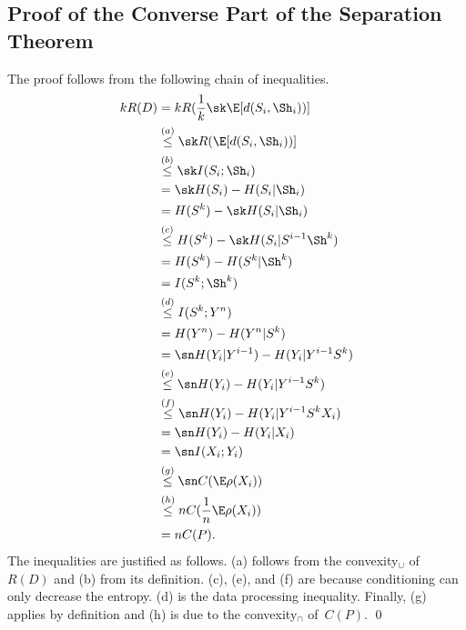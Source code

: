 \begin{subappendices}

\section{Proof of the Converse Part of the Separation Theorem}
\label{app:separationproof}

The proof follows from the following chain of inequalities.
{\allowdisplaybreaks
\begin{align*}
  kR(D) &= k R(\frac1k \sk \E[d(S_i, \Sh_i))] \\
  &\stackrel{(a)}{\le} \sk R(\E[d(S_i, \Sh_i))] \\
  &\stackrel{(b)}{\le} \sk I(S_i; \Sh_i) \\
  &= \sk H(S_i) - H(S_i|\Sh_i) \\
  &= H(S^k) - \sk H(S_i|\Sh_i) \\
  &\stackrel{(c)}{\le} H(S^k) - \sk H(S_i|S^{i-1} \Sh^k) \\
  &=H(S^k) - H(S^k|\Sh^k) \\
  &=I(S^k;\Sh^k) \\
  &\stackrel{(d)}{\le} I(S^k; Y^n) \\
  &= H(Y^n) - H(Y^n|S^k) \\
  &= \sn H(Y_i|Y^{i-1}) - H(Y_i|Y^{i-1} S^k)  \\
  &\stackrel{(e)}{\le} \sn H(Y_i) - H(Y_i|Y^{i-1} S^k) \\
  &\stackrel{(f)}{\le} \sn H(Y_i) - H(Y_i|Y^{i-1} S^k X_i) \\
  &= \sn H(Y_i) - H(Y_i|X_i) \\
  &= \sn I(X_i; Y_i) \\
  &\stackrel{(g)}{\le} \sn C(\E \rho(X_i)) \\
  &\stackrel{(h)}{\le} n C(\frac1n \E \rho(X_i)) \\
  &= n C(P).
\end{align*}}%
The inequalities are justified as follows. (a) follows from the convexity$_\cup$
of~$R(D)$ and (b) from its definition. (c), (e), and (f) are because
conditioning can only decrease the entropy. (d) is the data processing
inequality. Finally, (g) applies by definition and (h) is due to the
convexity$_\cap$ of~$C(P)$.  \hfil\qed

\end{subappendices}
